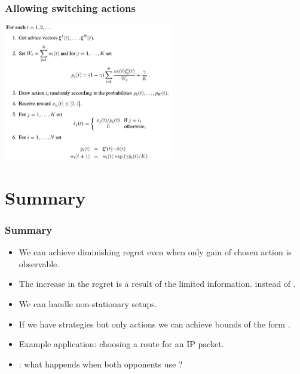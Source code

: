\documentclass[handout]{beamer}
\begin{document}
\begin{frame}
\frametitle{Allowing switching actions}
\includegraphics[height=6cm]{figures/Exp4.jpg}
\end{frame}

\section{Summary}

\begin{frame}
\frametitle{Summary}
\begin{itemize}
\item We can achieve diminishing regret even when only gain of chosen action is observable.
\item The increase in the regret is a result of the limited information. 
 instead of .
\item We can handle non-stationary setups.
\item If we have  strategies  but only  actions  we can achieve bounds of the form .
\item Example application: choosing a route for an IP packet.
\item {}: what happends when both opponents use \hedge?
\end{itemize}
\end{frame}


%
\end{document}

